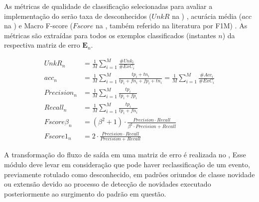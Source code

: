As métricas de qualidade de classificação selecionadas para avaliar a
implementação do \mfog serão
taxa de desconhecidos ($UnkR$ na ) \cite{Faria2013},
acurácia média ($acc$ na )
e Macro F-score ($Fscore$ na , também referido na literatura por
F1M) \cite{Sokolova2009,DaSilva2018thesis}.
As métricas são extraídas para todos os exemplos classificados (instantes $n$)
da respectiva matriz de erro $\mathbf{E}_n$.



\begin{align}
  \mathit{UnkR}_n       &= \frac{1}{M} \sum_{i=1}^{M} \frac{\#Unk_i}{\#ExC_i} \label{eq:unkr} \\
  \mathit{acc}_n        &= \frac{1}{M} \sum_{i=1}^{M} \frac{tp_i + tn_i}{tp_i+fn_i+fp_i+tn_i}
  = \frac{1}{M} \sum_{i=1}^{M} \frac{\#Acc_i}{\#ExC_i}  \label{eq:acc} \\
  \mathit{Precision}_n  &= \frac{1}{M} \sum_{i=1}^{M} \frac{tp_i}{tp_i+fp_i} \\
  \mathit{Recall}_n     &= \frac{1}{M} \sum_{i=1}^{M} \frac{tp_i}{tp_i+fn_i} \\
  \mathit{Fscore}\beta_n &= (\beta^2 +1) \cdot
  \frac{
  \mathit{Precision} \cdot \mathit{Recall}
  }{
    \beta^2 \cdot \mathit{Precision} +\mathit{Recall}
  }\\
  \mathit{Fscore}1_n   &= 2 \cdot \frac{
    \mathit{Precision} \cdot \mathit{Recall}
    }{
      \mathit{Precision} +\mathit{Recall}
    } \label{eq:fscore}
\end{align}


A transformação do fluxo de saída em uma matriz de erro é realizada no \sink,
Esse módulo deve levar em consideração que pode haver reclassificação de um
evento, previamente rotulado como desconhecido, em padrões oriundos de classe
novidade ou extensão devido ao processo de detecção de novidades executado
posteriormente ao surgimento do padrão em questão.

